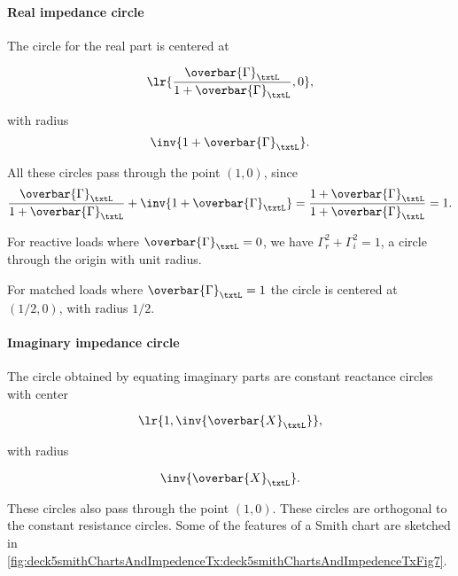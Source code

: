 \paragraph{Real impedance circle}

The circle for the real part is centered at 

\begin{dmath}\label{eqn:uwavesDeck5SmithChartCore:580}
\lr{ \frac{\overbar{\Gamma}_\txtL}{1 + \overbar{\Gamma}_\txtL }, 0 },
\end{dmath}

with radius
\begin{dmath}\label{eqn:uwavesDeck5SmithChartCore:600}
\inv{1 + \overbar{\Gamma}_\txtL }.
\end{dmath}

All these circles pass through the point \( (1,0) \), since
\begin{dmath}\label{eqn:uwavesDeck5SmithChartCore:620}
\frac{\overbar{\Gamma}_\txtL}{1 + \overbar{\Gamma}_\txtL } + \inv{1 + \overbar{\Gamma}_\txtL }
=
\frac{1 + \overbar{\Gamma}_\txtL}{1 + \overbar{\Gamma}_\txtL }
= 1.
\end{dmath}

For reactive loads where \( \overbar{\Gamma}_\txtL = 0 \), we have \( \Gamma_r^2 + \Gamma_i^2 = 1 \), a circle through the origin with unit radius.

For matched loads where \( \overbar{\Gamma}_\txtL = 1 \) the circle is centered at \( (1/2, 0) \), with radius \( 1/2 \).

\paragraph{Imaginary impedance circle}

The circle obtained by equating imaginary parts are constant reactance circles with center

\begin{dmath}\label{eqn:uwavesDeck5SmithChartCore:640}
\lr{ 1, \inv{\overbar{X}_\txtL } }, 
\end{dmath}

with radius 

\begin{dmath}\label{eqn:uwavesDeck5SmithChartCore:660}
\inv{\overbar{X}_\txtL}.
\end{dmath}

These circles also pass through the point \( (1,0) \).  These circles are orthogonal to the constant resistance circles.  Some of the features of a Smith chart are sketched in \cref{fig:deck5smithChartsAndImpedenceTx:deck5smithChartsAndImpedenceTxFig7}.

